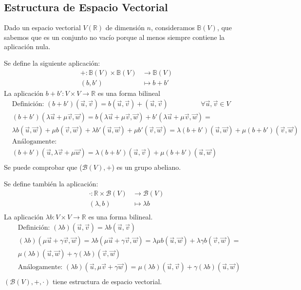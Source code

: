 \documentclass[x11names,table]{report}
\begin{document}
\subsection*{Estructura de Espacio Vectorial}

Dado un espacio vectorial $V(\mathbb{R})$ de dimensión $n$, consideramos $\mathbb{B}(V)$, que sabemos que es un conjunto no vacío porque al menos siempre contiene la aplicación nula.

Se define la siguiente aplicación:
\[\begin{split}
+:\mathbb{B}(V)\times\mathbb{B}(V)&\longrightarrow\mathbb{B}(V)\\
(b,b')&\longmapsto b+b'
\end{split}\]
La aplicación $b+b':V\times V\longrightarrow\mathbb{R}$ es una forma bilineal
\begin{align*}
 & \text{Definición: }(b+b')(\vec{u},\vec{v})=b(\vec{u},\vec{v})+(\vec{u},\vec{v})\hspace{2cm} \forall \vec{u},\vec{v}\in V \\
 & (b+b')(\lambda\vec{u}+\mu \vec{v},\vec{w})=b(\lambda\vec{u}+\mu \vec{v},\vec{w})+b'(\lambda\vec{u}+\mu \vec{v},\vec{w})=  \\
 & \lambda b(\vec{u},\vec{w})+\mu b(\vec{v},\vec{w}) + \lambda b'(\vec{u},\vec{w})+\mu b'(\vec{v},\vec{w})=\lambda(b+b')(\vec{u},\vec{w})+\mu (b+b')(\vec{v},\vec{w})  \\ 
  & \text{Análogamente: }\\
  & (b+b')(\vec{u},\lambda\vec{v}+\mu \vec{w})=\lambda (b+b')(\vec{u},\vec{v})+\mu(b+b')(\vec{u},\vec{w})\\
\end{align*}
Se puede comprobar que ($\mathcal{B}(V),+$) es un grupo abeliano.

Se define también la aplicación:
\[\begin{split}
\cdot :\mathbb{R}\times\mathcal{B}(V)&\longrightarrow\mathcal{B}(V)\\
(\lambda,b)&\longmapsto \lambda b\\
\end{split}\]
La aplicación $\lambda b:V\times V\longrightarrow\mathbb{R}$ es una forma bilineal.
\begin{align*}
 & \text{Definición: }(\lambda b)(\vec{u},\vec{v})=\lambda b(\vec{u},\vec{v})\\
 & (\lambda b)(\mu \vec{u}+\gamma\vec{v},\vec{w})=\lambda b(\mu \vec{u}+\gamma\vec{v},\vec{w})=\lambda\mu b(\vec{u},\vec{w})+\lambda\gamma b(\vec{v},\vec{w})=\\
 & \mu(\lambda b)(\vec{u},\vec{w})+\gamma(\lambda b)(\vec{v},\vec{w})\\
 & \text{Análogamente: }(\lambda b)(\vec{u},\mu \vec{v}+\gamma\vec{w})=\mu(\lambda b)(\vec{u},\vec{v})+\gamma(\lambda b)(\vec{u},\vec{w})\\
\end{align*}
$(\mathcal{B}(V),+,\cdot)$ tiene estructura de espacio vectorial.
\end{document}
